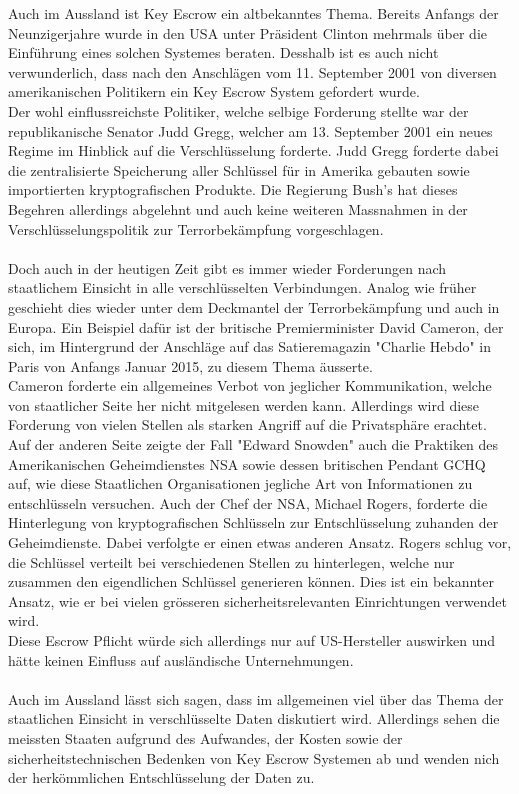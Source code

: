 Auch im Aussland ist Key Escrow ein altbekanntes Thema. Bereits Anfangs der Neunzigerjahre wurde in den USA unter Präsident Clinton mehrmals über die Einführung eines solchen Systemes beraten. \cite{adminch} \cite{denning} %
Desshalb ist es auch nicht verwunderlich, dass nach den Anschlägen vom 11. September 2001 von diversen amerikanischen Politikern ein Key Escrow System gefordert wurde. \\
Der wohl einflussreichste Politiker, welche selbige Forderung stellte war der republikanische Senator Judd Gregg, welcher am 13. September 2001 ein neues Regime im Hinblick auf die Verschlüsselung forderte. Judd Gregg forderte dabei die zentralisierte Speicherung aller Schlüssel für in Amerika gebauten sowie importierten kryptografischen Produkte. Die Regierung Bush's hat dieses Begehren allerdings abgelehnt und auch keine weiteren Massnahmen in der Verschlüsselungspolitik zur Terrorbekämpfung vorgeschlagen. \cite{denning}\\ %
\\
Doch auch in der heutigen Zeit gibt es immer wieder Forderungen nach staatlichem Einsicht in alle verschlüsselten Verbindungen. Analog wie früher geschieht dies wieder unter dem Deckmantel der Terrorbekämpfung und auch in Europa. Ein Beispiel dafür ist der britische Premierminister David Cameron, der sich, im Hintergrund der Anschläge auf das Satieremagazin "Charlie Hebdo" in Paris von Anfangs Januar 2015, zu diesem Thema äusserte. \\
Cameron forderte ein allgemeines Verbot von jeglicher Kommunikation, welche von staatlicher Seite her nicht mitgelesen werden kann. Allerdings wird diese Forderung von vielen Stellen als starken Angriff auf die Privatsphäre erachtet. \cite{insideit} \\%
Auf der anderen Seite zeigte der Fall "Edward Snowden" auch die Praktiken des Amerikanischen Geheimdienstes NSA sowie dessen britischen Pendant GCHQ auf, wie diese Staatlichen Organisationen jegliche Art von Informationen zu entschlüsseln versuchen. Auch der Chef der NSA, Michael Rogers, forderte die Hinterlegung von kryptografischen Schlüsseln zur Entschlüsselung zuhanden der Geheimdienste. Dabei verfolgte er einen etwas anderen Ansatz. Rogers schlug vor, die Schlüssel verteilt bei verschiedenen Stellen zu hinterlegen, welche nur zusammen den eigendlichen Schlüssel generieren können. Dies ist ein bekannter Ansatz, wie er bei vielen grösseren sicherheitsrelevanten Einrichtungen verwendet wird. \\
Diese Escrow Pflicht würde sich allerdings nur auf US-Hersteller auswirken und hätte keinen Einfluss auf ausländische Unternehmungen. \cite{annabiselli} \\ %
\\
Auch im Aussland lässt sich sagen, dass im allgemeinen viel über das Thema der staatlichen Einsicht in verschlüsselte Daten diskutiert wird. Allerdings sehen die meissten Staaten aufgrund des Aufwandes, der Kosten sowie der sicherheitstechnischen Bedenken von Key Escrow Systemen ab und wenden nich der herkömmlichen Entschlüsselung der Daten zu.

